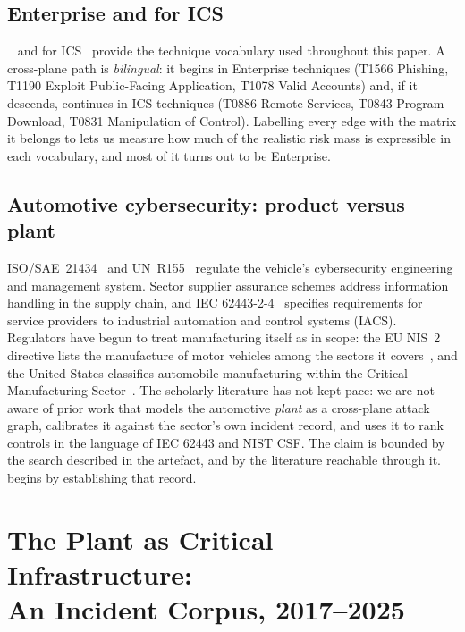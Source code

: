 \subsection{\attck{} Enterprise and \attck{} for ICS}

\attck{}~\cite{strom2018attack} and \attck{} for ICS~\cite{alexander2020icsattack}
provide the technique vocabulary used throughout this paper. A cross-plane path is \emph{bilingual}: it begins in Enterprise techniques
(T1566 Phishing, T1190 Exploit Public-Facing Application, T1078 Valid Accounts)
and, if it descends, continues in ICS techniques (T0886 Remote Services, T0843
Program Download, T0831 Manipulation of Control). Labelling every edge with the
matrix it belongs to lets us measure how much of the realistic risk mass is
expressible in each vocabulary, and most of it turns out to be Enterprise.

\subsection{Automotive cybersecurity: product versus plant}

ISO/SAE~21434~\cite{isosae21434} and UN~R155~\cite{unr155} regulate the
vehicle's cybersecurity engineering and management system. Sector supplier
assurance schemes address information handling in the supply chain, and IEC 62443-2-4~\cite{iec6244324} specifies requirements for service providers
to industrial automation and control systems (IACS).
Regulators have begun to treat manufacturing itself as in scope: the EU NIS~2
directive lists the manufacture of motor vehicles among the sectors it
covers~\cite{nis2directive}, and the United States classifies automobile
manufacturing within the Critical Manufacturing
Sector~\cite{cisacriticalmanufacturing}. The scholarly literature has not kept
pace: we are not aware of prior work that models the automotive \emph{plant} as a
cross-plane attack graph, calibrates it against the sector's own incident
record, and uses it to rank controls in the language of IEC 62443 and NIST
CSF. The claim is bounded by the search described in the artefact, and by the
literature reachable through it.
 begins by establishing that record.

\section{The Plant as Critical Infrastructure:\\ An Incident Corpus, 2017--2025}
\label{sec:corpus}

